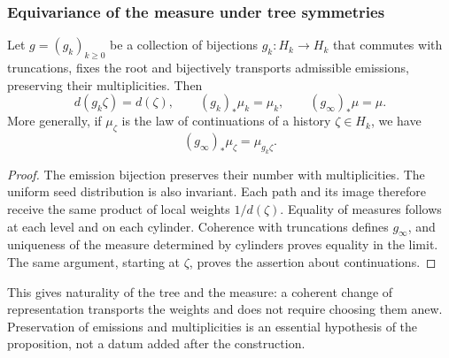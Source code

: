 \subsubsection{Equivariance of the measure under tree symmetries}
\label{hmtfg:base:sec:ch-naturalidad-medida}

\begin{proposition}
\label{hmtfg:base:prop:ch-naturalidad-medida}
Let \(g=(g_k)_{k\geq0}\) be a collection of bijections \(g_k:H_k\to H_k\) that commutes with truncations, fixes the root and bijectively transports admissible emissions, preserving their multiplicities. Then
\[
 d(g_k\zeta)=d(\zeta),\qquad
 (g_k)_*\mu_k=\mu_k,\qquad (g_\infty)_*\mu=\mu.
\]
More generally, if \(\mu_\zeta\) is the law of continuations of a
history \(\zeta\in H_k\), we have
\[
 (g_\infty)_*\mu_\zeta=\mu_{g_k\zeta}.
\]
\end{proposition}

\begin{proof}
The emission bijection preserves their number with multiplicities. The
uniform seed distribution is also invariant. Each path
and its image therefore receive the same product of local weights
\(1/d(\zeta)\). Equality of measures follows at each level and on
each cylinder. Coherence with truncations defines \(g_\infty\),
and uniqueness of the measure determined by cylinders proves equality
in the limit. The same argument, starting at \(\zeta\), proves the
assertion about continuations.
\end{proof}

This gives naturality of the tree and the measure: a coherent change
of representation transports the weights and does not require choosing them anew.
Preservation of emissions and multiplicities is an essential hypothesis of
the proposition, not a datum added after the construction.
